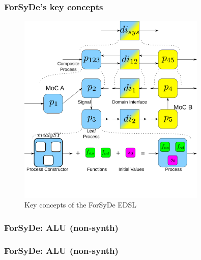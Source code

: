 \documentclass{beamer}
\begin{document}
            \begin{frame}
                \frametitle{ForSyDe's key concepts}
                \begin{figure}[h!]
                    \centerline{\includegraphics[width=0.8\textwidth]{imgs/forsyde-model.pdf}}
                    \caption{Key concepts of the ForSyDe EDSL
                        \label{fig:forsyde-model}}
                \end{figure}
            \end{frame}

            \begin{frame}
                \frametitle{ForSyDe: ALU (non-synth)}
            \end{frame}

            \begin{frame}
                \frametitle{ForSyDe: ALU (non-synth)}
            \end{frame}
\end{document}
